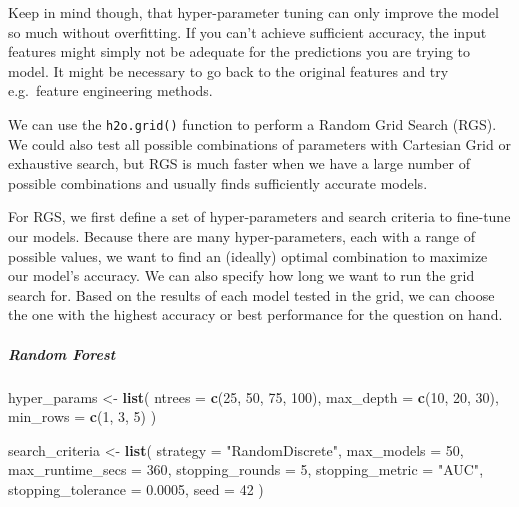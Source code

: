 \documentclass[]{article}
\newenvironment{Shaded}{\begin{snugshade}}{\end{snugshade}}
\newcommand{\KeywordTok}[1]{\textcolor[rgb]{0.13,0.29,0.53}{\textbf{{#1}}}}
\newcommand{\DataTypeTok}[1]{\textcolor[rgb]{0.13,0.29,0.53}{{#1}}}
\newcommand{\DecValTok}[1]{\textcolor[rgb]{0.00,0.00,0.81}{{#1}}}
\newcommand{\FloatTok}[1]{\textcolor[rgb]{0.00,0.00,0.81}{{#1}}}
\newcommand{\StringTok}[1]{\textcolor[rgb]{0.31,0.60,0.02}{{#1}}}
\newcommand{\NormalTok}[1]{{#1}}
\let\oldsubparagraph\subparagraph
\renewcommand{\subparagraph}[1]{\oldsubparagraph{#1}\mbox{}}
\begin{document}
Keep in mind though, that hyper-parameter tuning can only improve the
model so much without overfitting. If you can't achieve sufficient
accuracy, the input features might simply not be adequate for the
predictions you are trying to model. It might be necessary to go back to
the original features and try e.g.~feature engineering methods.

We can use the \texttt{h2o.grid()} function to perform a Random Grid
Search (RGS). We could also test all possible combinations of parameters
with Cartesian Grid or exhaustive search, but RGS is much faster when we
have a large number of possible combinations and usually finds
sufficiently accurate models.

For RGS, we first define a set of hyper-parameters and search criteria
to fine-tune our models. Because there are many hyper-parameters, each
with a range of possible values, we want to find an (ideally) optimal
combination to maximize our model's accuracy. We can also specify how
long we want to run the grid search for. Based on the results of each
model tested in the grid, we can choose the one with the highest
accuracy or best performance for the question on hand.

\subparagraph{Random Forest}\label{random-forest}

\begin{Shaded}
\begin{Highlighting}[]
\NormalTok{hyper_params <-}\StringTok{ }\KeywordTok{list}\NormalTok{(}
                     \DataTypeTok{ntrees =} \KeywordTok{c}\NormalTok{(}\DecValTok{25}\NormalTok{, }\DecValTok{50}\NormalTok{, }\DecValTok{75}\NormalTok{, }\DecValTok{100}\NormalTok{),}
                     \DataTypeTok{max_depth =} \KeywordTok{c}\NormalTok{(}\DecValTok{10}\NormalTok{, }\DecValTok{20}\NormalTok{, }\DecValTok{30}\NormalTok{),}
                     \DataTypeTok{min_rows =} \KeywordTok{c}\NormalTok{(}\DecValTok{1}\NormalTok{, }\DecValTok{3}\NormalTok{, }\DecValTok{5}\NormalTok{)}
                     \NormalTok{)}

\NormalTok{search_criteria <-}\StringTok{ }\KeywordTok{list}\NormalTok{(}
                        \DataTypeTok{strategy =} \StringTok{"RandomDiscrete"}\NormalTok{, }
                        \DataTypeTok{max_models =} \DecValTok{50}\NormalTok{,}
                        \DataTypeTok{max_runtime_secs =} \DecValTok{360}\NormalTok{,}
                        \DataTypeTok{stopping_rounds =} \DecValTok{5}\NormalTok{,          }
                        \DataTypeTok{stopping_metric =} \StringTok{"AUC"}\NormalTok{,      }
                        \DataTypeTok{stopping_tolerance =} \FloatTok{0.0005}\NormalTok{,}
                        \DataTypeTok{seed =} \DecValTok{42}
                        \NormalTok{)}
\end{Highlighting}
\end{Shaded}
\end{document}

